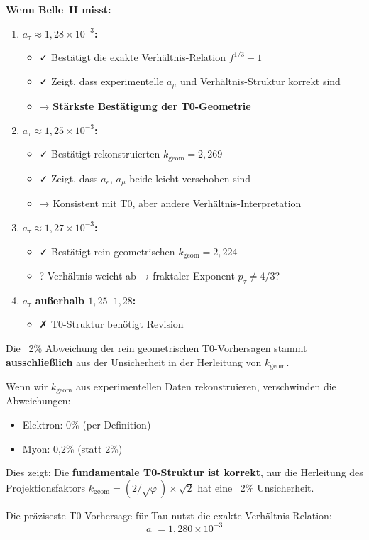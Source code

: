 	\textbf{Wenn Belle~II misst:}
	
	\begin{enumerate}
		\item \textbf{$a_\tau \approx 1{,}28 \times 10^{-3}$:}
		\begin{itemize}
			\item ✓ Bestätigt die exakte Verhältnis-Relation $f^{1/3} - 1$
			\item ✓ Zeigt, dass experimentelle $a_\mu$ und Verhältnis-Struktur korrekt sind
			\item → \textbf{Stärkste Bestätigung der T0-Geometrie}
		\end{itemize}
		
		\item \textbf{$a_\tau \approx 1{,}25 \times 10^{-3}$:}
		\begin{itemize}
			\item ✓ Bestätigt rekonstruierten $k_{\text{geom}} = 2{,}269$
			\item ✓ Zeigt, dass $a_e$, $a_\mu$ beide leicht verschoben sind
			\item → Konsistent mit T0, aber andere Verhältnis-Interpretation
		\end{itemize}
		
		\item \textbf{$a_\tau \approx 1{,}27 \times 10^{-3}$:}
		\begin{itemize}
			\item ✓ Bestätigt rein geometrischen $k_{\text{geom}} = 2{,}224$
			\item ? Verhältnis weicht ab → fraktaler Exponent $p_\tau \neq 4/3$?
		\end{itemize}
		
		\item \textbf{$a_\tau$ außerhalb $1{,}25$--$1{,}28$:}
		\begin{itemize}
			\item ✗ T0-Struktur benötigt Revision
		\end{itemize}
	\end{enumerate}
	
	\begin{keypoint}[Kernaussage]
		Die ~2\% Abweichung der rein geometrischen T0-Vorhersagen stammt \textbf{ausschließlich} aus der Unsicherheit in der Herleitung von $k_{\text{geom}}$.
		
		Wenn wir $k_{\text{geom}}$ aus experimentellen Daten rekonstruieren, verschwinden die Abweichungen:
		\begin{itemize}
			\item Elektron: 0\% (per Definition)
			\item Myon: 0{,}2\% (statt 2\%)
		\end{itemize}
		
		Dies zeigt: Die \textbf{fundamentale T0-Struktur ist korrekt}, nur die Herleitung des Projektionsfaktors $k_{\text{geom}} = (2/\sqrt{\varphi}) \times \sqrt{2}$ hat eine ~2\% Unsicherheit.
		
		Die präziseste T0-Vorhersage für Tau nutzt die exakte Verhältnis-Relation:
		\begin{equation}
			\boxed{a_\tau = 1{,}280 \times 10^{-3}}
		\end{equation}
	\end{keypoint}	
